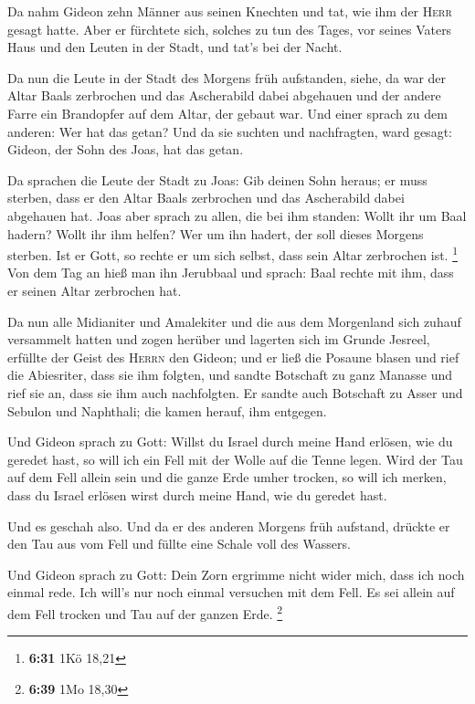  Da nahm Gideon zehn Männer aus seinen Knechten und tat,
wie ihm der \textsc{Herr} gesagt hatte. Aber er fürchtete sich, solches
zu tun des Tages, vor seines Vaters Haus und den Leuten in der Stadt,
und tat's bei der Nacht.

 Da nun die Leute in der Stadt des Morgens früh
aufstanden, siehe, da war der Altar Baals zerbrochen und das Ascherabild
dabei abgehauen und der andere Farre ein Brandopfer auf dem Altar, der
gebaut war.  Und einer sprach zu dem anderen: Wer hat das
getan? Und da sie suchten und nachfragten, ward gesagt: Gideon, der Sohn
des Joas, hat das getan.

 Da sprachen die Leute der Stadt zu Joas: Gib deinen Sohn
heraus; er muss sterben, dass er den Altar Baals zerbrochen und das
Ascherabild dabei abgehauen hat.  Joas aber sprach zu
allen, die bei ihm standen: Wollt ihr um Baal hadern? Wollt ihr ihm
helfen? Wer um ihn hadert, der soll dieses Morgens sterben. Ist er Gott,
so rechte er um sich selbst, dass sein Altar zerbrochen ist. \footnote{\textbf{6:31}
  1Kö 18,21}  Von dem Tag an hieß man ihn Jerubbaal und
sprach: Baal rechte mit ihm, dass er seinen Altar zerbrochen hat.

 Da nun alle Midianiter und Amalekiter und die aus dem
Morgenland sich zuhauf versammelt hatten und zogen herüber und lagerten
sich im Grunde Jesreel,  erfüllte der Geist des
\textsc{Herrn} den Gideon; und er ließ die Posaune blasen und rief die
Abiesriter, dass sie ihm folgten,  und sandte Botschaft
zu ganz Manasse und rief sie an, dass sie ihm auch nachfolgten. Er
sandte auch Botschaft zu Asser und Sebulon und Naphthali; die kamen
herauf, ihm entgegen.

 Und Gideon sprach zu Gott: Willst du Israel durch meine
Hand erlösen, wie du geredet hast,  so will ich ein Fell
mit der Wolle auf die Tenne legen. Wird der Tau auf dem Fell allein sein
und die ganze Erde umher trocken, so will ich merken, dass du Israel
erlösen wirst durch meine Hand, wie du geredet hast.

 Und es geschah also. Und da er des anderen Morgens früh
aufstand, drückte er den Tau aus vom Fell und füllte eine Schale voll
des Wassers.

 Und Gideon sprach zu Gott: Dein Zorn ergrimme nicht
wider mich, dass ich noch einmal rede. Ich will's nur noch einmal
versuchen mit dem Fell. Es sei allein auf dem Fell trocken und Tau auf
der ganzen Erde. \footnote{\textbf{6:39} 1Mo 18,30}

